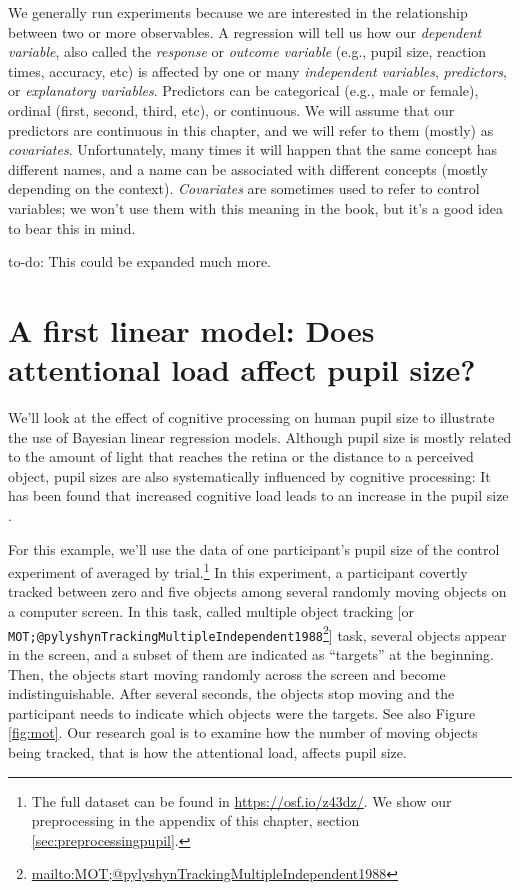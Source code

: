 \documentclass[12pt,]{krantz}
\renewcommand{\href}[2]{#2\footnote{\url{#1}}}
\theoremstyle{definition}
\theoremstyle{definition}
\theoremstyle{definition}
\theoremstyle{remark}
\let\BeginKnitrBlock\begin \let\EndKnitrBlock\end
\begin{document}
We generally run experiments because we are interested in the relationship between two or more observables. A regression will tell us how our \emph{dependent variable}, also called the \emph{response} or \emph{outcome variable} (e.g., pupil size, reaction times, accuracy, etc) is affected by one or many \emph{independent variables}, \emph{predictors}, or \emph{explanatory variables}. Predictors can be categorical (e.g., male or female), ordinal (first, second, third, etc), or continuous. We will assume that our predictors are continuous in this chapter, and we will refer to them (mostly) as \emph{covariates}. Unfortunately, many times it will happen that the same concept has different names, and a name can be associated with different concepts (mostly depending on the context). \emph{Covariates} are sometimes used to refer to control variables; we won't use them with this meaning in the book, but it's a good idea to bear this in mind.

\BeginKnitrBlock{rmdnote}
to-do: This could be expanded much more.
\EndKnitrBlock{rmdnote}

\hypertarget{sec:pupil}{%
\section{A first linear model: Does attentional load affect pupil size?}\label{sec:pupil}}

We'll look at the effect of cognitive processing on human pupil size to illustrate the use of Bayesian linear regression models. Although pupil size is mostly related to the amount of light that reaches the retina or the distance to a perceived object, pupil sizes are also systematically influenced by cognitive processing: It has been found that increased cognitive load leads to an increase in the pupil size \citep[for a review, see][]{mathotPupillometryPsychologyPhysiology2018}.

For this example, we'll use the data of one participant's pupil size of the control experiment of \citet{wahnPupilSizesScale2016} averaged by trial.\footnote{The full dataset can be found in \url{https://osf.io/z43dz/}. We show our preprocessing in the appendix of this chapter, section \ref{sec:preprocessingpupil}.}
In this experiment, a participant covertly tracked between zero and five objects among several randomly moving objects on a computer screen. In this task, called multiple object tracking {[}or \href{mailto:MOT;@pylyshynTrackingMultipleIndependent1988}{\nolinkurl{MOT;@pylyshynTrackingMultipleIndependent1988}}{]} task, several objects appear in the screen, and a subset of them
are indicated as ``targets'' at the beginning. Then, the objects start moving randomly across the screen and become indistinguishable. After several seconds, the objects stop moving and the participant needs to indicate which objects were the targets. See also Figure \ref{fig:mot}. Our research goal is to examine how the number of moving objects being tracked, that is how the attentional load, affects pupil size.
\end{document}
